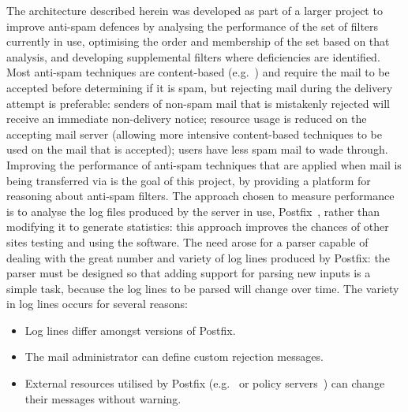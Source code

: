 \documentclass[preprint,draft,numbers]{elsarticle}
\begin{document}
The architecture described herein was developed as part of a larger project
to improve anti-spam defences by analysing the performance of the set of
filters currently in use, optimising the order and membership of the set
based on that analysis, and developing supplemental filters where
deficiencies are identified.  Most anti-spam techniques are content-based
(e.g.~\cite{a-plan-for-spam, word-stemming, relaxed-online-svms}) and
require the mail to be accepted before determining if it is spam, but
rejecting mail during the delivery attempt is preferable: senders of
non-spam mail that is mistakenly rejected will receive an immediate
non-delivery notice; resource usage is reduced on the accepting mail server
(allowing more intensive content-based techniques to be used on the mail
that is accepted); users have less spam mail to wade through.  Improving
the performance of anti-spam techniques that are applied when mail is being
transferred via \SMTP{}\footnotemark{} is the goal of this project, by
providing a platform for reasoning about anti-spam filters.  The approach
chosen to measure performance is to analyse the log files produced by the
\SMTP{} server in use, Postfix~\cite{postfix}, rather than modifying it to
generate statistics: this approach improves the chances of other sites
testing and using the software.  The need arose for a parser capable of
dealing with the great number and variety of log lines produced by Postfix:
the parser must be designed so that adding support for parsing new inputs
is a simple task, because the log lines to be parsed will change over time.
The variety in log lines occurs for several reasons:

\begin{itemize}

    \item Log lines differ amongst versions of Postfix.
        
    \item The mail administrator can define custom rejection messages.

    \item External resources utilised by Postfix (e.g.\ \DNSBL{} or policy
        servers~\cite{policy-servers}) can change their messages without
        warning.

\end{itemize}
\end{document}

